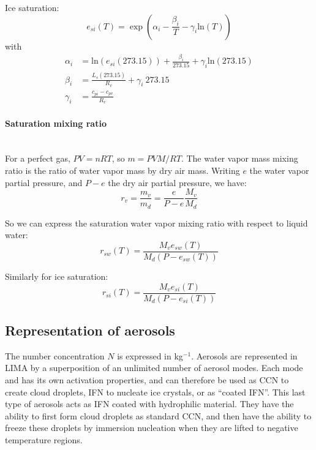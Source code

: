 Ice saturation:
\begin{equation}
 \label{saturation-pressure-ice}
 e_{si}(T) = \exp(\alpha_i - \frac{\beta_i}{T} - \gamma_i\mathrm{ln}(T))
\end{equation}
with
\begin{align}
 \alpha_i &= \mathrm{ln}(e_{si}(273.15)) + \frac{\beta_i}{273.15} + \gamma_i\mathrm{ln}(273.15) \\
 \beta_i &= \frac{L_s(273.15)}{R_v} + \gamma_i ~ 273.15 \\
 \gamma_i &= \frac{c_{pi} - c_{pv}}{R_v}
\end{align}

\paragraph{Saturation mixing ratio}
~\\
For a perfect gas, $PV=nRT$, so $m=PVM/RT$. The water vapor mass mixing ratio is the ratio of water vapor mass by dry air mass. Writing $e$ the water vapor partial pressure, and $P-e$ the dry air partial pressure, we have:
\begin{equation}
 r_v = \frac{m_v}{m_d} = \frac{e}{P-e} \frac{M_v}{M_d}
\end{equation}

So we can express the saturation water vapor mixing ratio with respect to liquid water:
\begin{equation}
 \label{saturation-mr-water}
 r_{sw}(T) = \frac{M_v e_{sw}(T)}{M_d (P - e_{sw}(T))}
\end{equation}

Similarly for ice saturation:
\begin{equation}
 \label{saturation-mr-ice}
 r_{si}(T) = \frac{M_v e_{si}(T)}{M_d (P - e_{si}(T))}
\end{equation}

\subsection{Representation of aerosols}

The number concentration $N$ is expressed in kg$^{-1}$. Aerosols are represented in LIMA by a superposition of an unlimited number of aerosol modes. Each mode and has its own activation properties, and can therefore be used as CCN to create cloud droplets, IFN to nucleate ice crystals, or as ``coated IFN''. This last type of aerosols acts as IFN coated with hydrophilic material. They have the ability to first form cloud droplets as standard CCN, and then have the ability to freeze these droplets by immersion nucleation when they are lifted to negative temperature regions.

